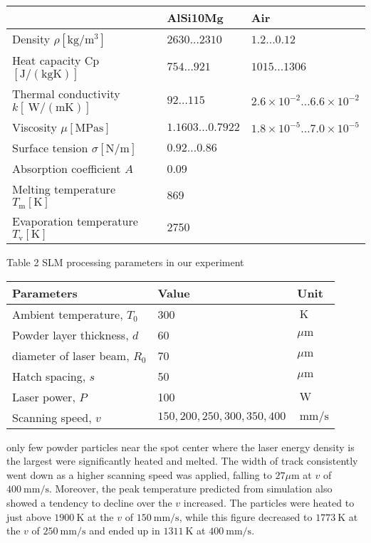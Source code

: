 \documentclass[10pt]{article}
\begin{document}
\begin{center}
\begin{tabular}{lll}
\hline
 & AlSi10Mg & Air \\
\hline
Density $\rho\left[\mathrm{kg} / \mathrm{m}^{3}\right]$ & $2630 \ldots 2310$ & $1.2 \ldots 0.12$ \\
Heat capacity Cp $[\mathrm{J} /(\mathrm{kg} \mathrm{K})]$ & $754 \ldots 921$ & $1015 \ldots 1306$ \\
Thermal conductivity $k[\mathrm{~W} /(\mathrm{m} \mathrm{K})]$ & $92 \ldots 115$ & $2.6 \times 10^{-2} \ldots 6.6 \times 10^{-2}$ \\
Viscosity $\mu[\mathrm{MPa} \mathrm{s}]$ & $1.1603 \ldots 0.7922$ & $1.8 \times 10^{-5} \ldots 7.0 \times 10^{-5}$ \\
Surface tension $\sigma[\mathrm{N} / \mathrm{m}]$ & $0.92 \ldots 0.86$ &  \\
Absorption coefficient $A$ & 0.09 &  \\
Melting temperature $T_{\mathrm{m}}[\mathrm{K}]$ & 869 &  \\
Evaporation temperature $T_{\mathrm{v}}[\mathrm{K}]$ & 2750 &  \\
\hline
\end{tabular}
\end{center}

Table 2 SLM processing parameters in our experiment

\begin{center}
\begin{tabular}{lll}
\hline
Parameters & Value & Unit \\
\hline
Ambient temperature, $T_{0}$ & 300 & $\mathrm{~K}$ \\
Powder layer thickness, $d$ & 60 & $\mu \mathrm{m}$ \\
diameter of laser beam, $R_{0}$ & 70 & $\mu \mathrm{m}$ \\
Hatch spacing, $s$ & 50 & $\mu \mathrm{m}$ \\
Laser power, $P$ & 100 & $\mathrm{~W}$ \\
Scanning speed, $v$ & $150,200,250,300,350,400$ & $\mathrm{~mm} / \mathrm{s}$ \\
\hline
\end{tabular}
\end{center}

only few powder particles near the spot center where the laser energy density is the largest were significantly heated and melted. The width of track consistently went down as a higher scanning speed was applied, falling to $27 \mu \mathrm{m}$ at $v$ of $400 \mathrm{~mm} / \mathrm{s}$. Moreover, the peak temperature predicted from simulation also showed a tendency to decline over the $v$ increased. The particles were heated to just above $1900 \mathrm{~K}$ at the $v$ of $150 \mathrm{~mm} / \mathrm{s}$, while this figure decreased to $1773 \mathrm{~K}$ at the $v$ of $250 \mathrm{~mm} / \mathrm{s}$ and ended up in $1311 \mathrm{~K}$ at $400 \mathrm{~mm} / \mathrm{s}$.
\end{document}
